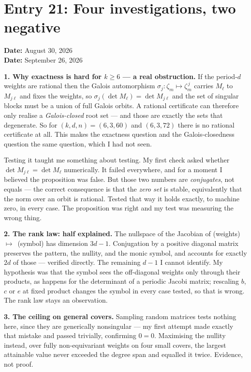 \documentclass[12pt]{article}
\begin{document}
\clearpage
\section*{Entry 21: Four investigations, two negative}
\textbf{Date:} August 30, 2026\\
\textbf{Date:} September 26, 2026

\textbf{1. Why exactness is hard for $k\ge6$ --- a real obstruction.} If the
period-$d$ weights are rational then the Galois automorphism
$\sigma_j:\zeta_m\mapsto\zeta_m^{\,j}$ carries $M_\ell$ to $M_{j\ell}$ and fixes
the weights, so $\sigma_j(\det M_\ell)=\det M_{j\ell}$ and the set of singular
blocks must be a union of full Galois orbits. A rational certificate can
therefore only realise a \emph{Galois-closed} root set --- and those are exactly
the sets that degenerate. So for $(k,d,n)=(6,3,60)$ and $(6,3,72)$ there is no
rational certificate at all. This makes the exactness question and the
Galois-closedness question the same question, which I had not seen.

Testing it taught me something about testing. My first check asked whether
$\det M_{j\ell}=\det M_\ell$ numerically. It failed everywhere, and for a
moment I believed the proposition was false. But those two numbers are
\emph{conjugates}, not equals --- the correct consequence is that the
\emph{zero set} is stable, equivalently that the norm over an orbit is
rational. Tested that way it holds exactly, to machine zero, in every case. The
proposition was right and my test was measuring the wrong thing.

\textbf{2. The rank law: half explained.} The nullspace of the Jacobian of
(weights)~$\mapsto$~(symbol) has dimension $3d-1$. Conjugation by a positive
diagonal matrix preserves the pattern, the nullity, and the monic symbol, and
accounts for exactly $2d$ of those --- verified directly. The remaining $d-1$ I
cannot identify. My hypothesis was that the symbol sees the off-diagonal
weights only through their products, as happens for the determinant of a
periodic Jacobi matrix; rescaling $b$, $c$ or $e$ at fixed product changes the
symbol in every case tested, so that is wrong. The rank law stays an
observation.

\textbf{3. The ceiling on general covers.} Sampling random matrices tests
nothing here, since they are generically nonsingular --- my first attempt made
exactly that mistake and passed trivially, confirming $0=0$. Maximising the
nullity instead, over fully non-equivariant weights on four small covers, the
largest attainable value never exceeded the degree span and equalled it twice.
Evidence, not proof.
\end{document}
